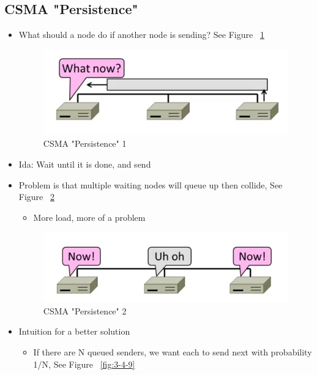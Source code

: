 \documentclass[12pt]{ctexart}   %
\begin{document}
	\subsection{CSMA "Persistence"}
	\begin{itemize}
		\item What should a node do if another node is sending?  
		See Figure~ \ref{fig:3-4-7}
		\begin{figure}[h!] %
		\centering
		 \includegraphics[scale=0.7]{images/3-4-7}
		\caption{ CSMA "Persistence" 1 }
		 \label{fig:3-4-7}
		 \end{figure}
		 
		\item Ida: Wait until it is done, and send
		
		\item Problem is that multiple waiting nodes will queue up then collide, See Figure~ \ref{fig:3-4-8}
		\begin{itemize}
			\item More load, more of a problem
		\end{itemize}
		
		\begin{figure}[h!] %
		\centering
		 \includegraphics[scale=0.7]{images/3-4-8}
		\caption{ CSMA "Persistence" 2 }
		 \label{fig:3-4-8}
		 \end{figure}
		 
		 \item Intuition for a better solution
		 \begin{itemize}
		 	\item If there are N queued senders, we want each to send next with probability 1/N, See Figure~ \ref{fig:3-4-9}
		 \end{itemize}
		 

\end{itemize}
\end{document}
